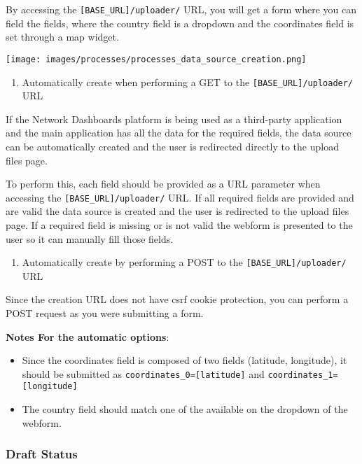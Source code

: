 \documentclass[
]{book}
\providecommand{\tightlist}{%
  \setlength{\itemsep}{0pt}\setlength{\parskip}{0pt}}
\begin{document}
By accessing the \texttt{{[}BASE\_URL{]}/uploader/} URL, you will get a form where you can field the fields, where the country field is a dropdown and the coordinates field is set through a map widget.

\texttt{[image: images/processes/processes\_data\_source\_creation.png]}

\begin{enumerate}
\def\labelenumi{\arabic{enumi}.}
\setcounter{enumi}{1}
\tightlist
\item
  Automatically create when performing a GET to the \texttt{{[}BASE\_URL{]}/uploader/} URL
\end{enumerate}

If the Network Dashboards platform is being used as a third-party application and the main application has all the data for the required fields, the data source can be automatically created and the user is redirected directly to the upload files page.

To perform this, each field should be provided as a URL parameter when accessing the \texttt{{[}BASE\_URL{]}/uploader/} URL. If all required fields are provided and are valid the data source is created and the user is redirected to the upload files page. If a required field is missing or is not valid the webform is presented to the user so it can manually fill those fields.

\begin{enumerate}
\def\labelenumi{\arabic{enumi}.}
\setcounter{enumi}{2}
\tightlist
\item
  Automatically create by performing a POST to the \texttt{{[}BASE\_URL{]}/uploader/} URL
\end{enumerate}

Since the creation URL does not have csrf cookie protection, you can perform a POST request as you were submitting a form.

\textbf{Notes For the automatic options}:

\begin{itemize}
\item
  Since the coordinates field is composed of two fields (latitude, longitude), it should be submitted as \texttt{coordinates\_0={[}latitude{]}} and \texttt{coordinates\_1={[}longitude{]}}
\item
  The country field should match one of the available on the dropdown of the webform.
\end{itemize}

\hypertarget{draft-status}{%
\subsubsection*{Draft Status}\label{draft-status}}
\end{document}
